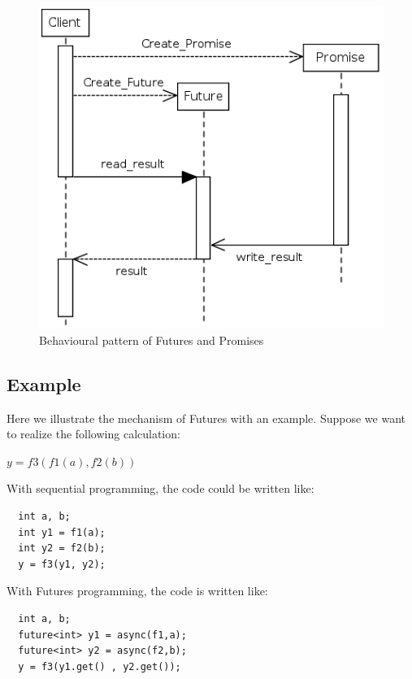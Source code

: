 \documentclass{llncs}
\begin{document}
\begin{figure}[h]
\begin{center}
\includegraphics[scale=0.5]{Images/Im1.png}
\end{center}
\caption{Behavioural pattern of Futures and Promises}
\label{thread}
\end{figure}

\subsection{Example}
Here we illustrate the mechanism of Futures with an example. Suppose we want to
realize the following calculation:   
\begin{center}
  $y = f3(f1(a),f2(b))$
\end{center}

With sequential programming, the code could be written like:
\begin{lstlisting}
  int a, b;
  int y1 = f1(a);
  int y2 = f2(b);
  y = f3(y1, y2);
\end{lstlisting}

With Futures programming, the code is written like:
\begin{lstlisting}
  int a, b;
  future<int> y1 = async(f1,a);
  future<int> y2 = async(f2,b);
  y = f3(y1.get() , y2.get());
\end{lstlisting}
\end{document}
